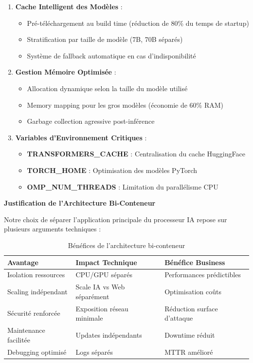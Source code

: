 \documentclass[12pt,a4paper]{report}
\begin{document}
\begin{enumerate}
    \item \textbf{Cache Intelligent des Modèles} :
    \begin{itemize}
        \item Pré-téléchargement au build time (réduction de 80\% du temps de startup)
        \item Stratification par taille de modèle (7B, 70B séparés)
        \item Système de fallback automatique en cas d'indisponibilité
    \end{itemize}

    \item \textbf{Gestion Mémoire Optimisée} :
    \begin{itemize}
        \item Allocation dynamique selon la taille du modèle utilisé
        \item Memory mapping pour les gros modèles (économie de 60\% RAM)
        \item Garbage collection agressive post-inférence
    \end{itemize}

    \item \textbf{Variables d'Environnement Critiques} :
    \begin{itemize}
        \item \textbf{TRANSFORMERS\_CACHE} : Centralisation du cache HuggingFace
        \item \textbf{TORCH\_HOME} : Optimisation des modèles PyTorch
        \item \textbf{OMP\_NUM\_THREADS} : Limitation du parallélisme CPU
    \end{itemize}
\end{enumerate}

\textbf{Justification de l'Architecture Bi-Conteneur}

Notre choix de séparer l'application principale du processeur IA repose sur plusieurs arguments techniques :

\begin{table}[H]
    \centering
    \begin{tabularx}{\textwidth}{|X|X|X|}
        \hline
        \textbf{Avantage} & \textbf{Impact Technique} & \textbf{Bénéfice Business} \\
        \hline
        Isolation ressources & CPU/GPU séparés & Performances prédictibles \\
        \hline
        Scaling indépendant & Scale IA vs Web séparément & Optimisation coûts \\
        \hline
        Sécurité renforcée & Exposition réseau minimale & Réduction surface d'attaque \\
        \hline
        Maintenance facilitée & Updates indépendants & Downtime réduit \\
        \hline
        Debugging optimisé & Logs séparés & MTTR amélioré \\
        \hline
    \end{tabularx}
    \caption{Bénéfices de l'architecture bi-conteneur}
\end{table}
\end{document}
